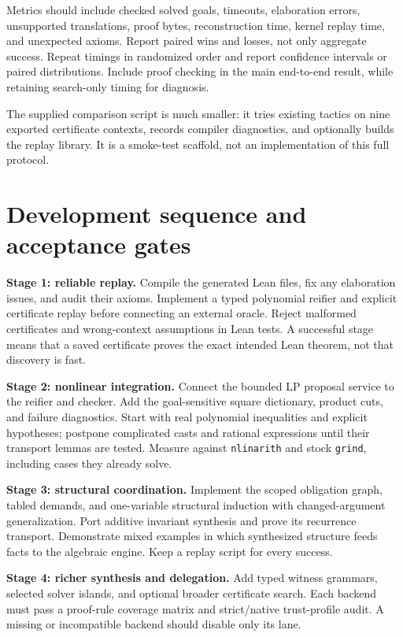 \documentclass[11pt,a4paper]{article}
\newcommand{\grind}{\texttt{grind}}
\newcommand{\code}[1]{\texttt{\small #1}}
\begin{document}
Metrics should include checked solved goals, timeouts, elaboration errors,
unsupported translations, proof bytes, reconstruction time, kernel replay time,
and unexpected axioms. Report paired wins and losses, not only aggregate
success. Repeat timings in randomized order and report confidence intervals
or paired distributions. Include proof checking in the main end-to-end result,
while retaining search-only timing for diagnosis.

The supplied comparison script is much smaller: it tries existing tactics on
nine exported certificate contexts, records compiler diagnostics, and optionally
builds the replay library. It is a smoke-test scaffold, not an implementation
of this full protocol.

\section{Development sequence and acceptance gates}

\textbf{Stage 1: reliable replay.} Compile the generated Lean files, fix any
elaboration issues, and audit their axioms. Implement a typed polynomial
reifier and explicit certificate replay before connecting an external oracle.
Reject malformed certificates and wrong-context assumptions in Lean tests.
A successful stage means that a saved certificate proves the exact intended
Lean theorem, not that discovery is fast.

\textbf{Stage 2: nonlinear integration.} Connect the bounded LP proposal service
to the reifier and checker. Add the goal-sensitive square dictionary, product
cuts, and failure diagnostics. Start with real polynomial inequalities and
explicit hypotheses; postpone complicated casts and rational expressions until
their transport lemmas are tested. Measure against \code{nlinarith} and stock
\grind, including cases they already solve.

\textbf{Stage 3: structural coordination.} Implement the scoped obligation graph,
tabled demands, and one-variable structural induction with changed-argument
generalization. Port additive invariant synthesis and prove its recurrence
transport. Demonstrate mixed examples in which synthesized structure feeds
facts to the algebraic engine. Keep a replay script for every success.

\textbf{Stage 4: richer synthesis and delegation.} Add typed witness grammars,
selected solver islands, and optional broader certificate search. Each backend
must pass a proof-rule coverage matrix and strict/native trust-profile audit.
A missing or incompatible backend should disable only its lane.
\end{document}
